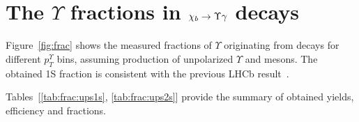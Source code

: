 \section{The \texorpdfstring{$\Upsilon$}{Y} fractions in \texorpdfstring{$\chi_{b} \rightarrow \Upsilon \gamma$}{chib --> Y gamma} decays}
\label{sec:mc}

Figure~\ref{fig:frac} shows the measured fractions of $\Upsilon$ originating
from \chib decays for different $p_T^{\Upsilon}$ bins,  assuming production of
unpolarized $\Upsilon$ and \chib mesons. The obtained \Y1S fraction is
consistent with the previous LHCb result~\cite{LHCb-PAPER-2012-015}.



Tables~[\ref{tab:frac:ups1s}, \ref{tab:frac:ups2s}] provide the summary
of obtained yields, efficiency and fractions.

